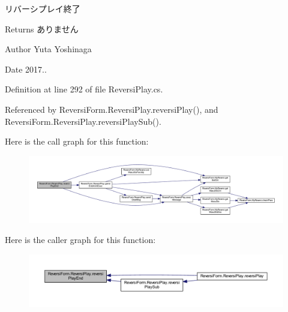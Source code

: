 リバーシプレイ終了 

\begin{DoxyReturn}{Returns}
ありません 
\end{DoxyReturn}
\begin{DoxyAuthor}{Author}
Yuta Yoshinaga 
\end{DoxyAuthor}
\begin{DoxyDate}{Date}
2017.. 
\end{DoxyDate}


Definition at line 292 of file Reversi\+Play.\+cs.



Referenced by Reversi\+Form.\+Reversi\+Play.\+reversi\+Play(), and Reversi\+Form.\+Reversi\+Play.\+reversi\+Play\+Sub().

Here is the call graph for this function\+:
\nopagebreak
\begin{figure}[H]
\begin{center}
\leavevmode
\includegraphics[width=350pt]{class_reversi_form_1_1_reversi_play_abb6d68c910c7d14ff4eaa8db745f0449_cgraph}
\end{center}
\end{figure}
Here is the caller graph for this function\+:
\nopagebreak
\begin{figure}[H]
\begin{center}
\leavevmode
\includegraphics[width=350pt]{class_reversi_form_1_1_reversi_play_abb6d68c910c7d14ff4eaa8db745f0449_icgraph}
\end{center}
\end{figure}
\mbox{\label{class_reversi_form_1_1_reversi_play_adcbe040514044b7cc8498c0764638356}} 
